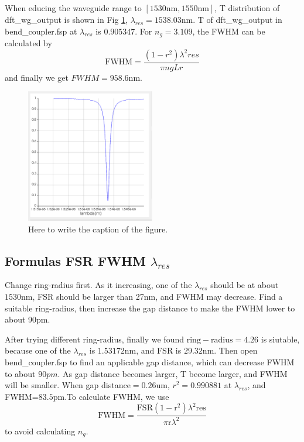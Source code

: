 \documentclass[fontsize=11pt]{scrartcl}
\begin{document}
\subsection{}
When educing the waveguide range to $[1530\mathrm{nm},1550\mathrm{nm}]$, 
T distribution of dft\_wg\_output is shown in Fig \ref{fig3.2}, 
$\lambda_{res}=1538.03\mathrm{nm}$. 
T of dft\_wg\_output in bend\_coupler.fsp at $\lambda_{res}$ is $0.905347$. 
For $n_g=3.109$, the FWHM can be calculated by 
\begin{equation}
    \mathrm{FWHM}=\frac{\left(1-r^{2}\right) \lambda^{2} r e s}{\pi n g L r}
    \label{eq4}
\end{equation}
and finally we get $FWHM=958.6\mathrm{nm}$.
\begin{figure}[H]
    \centering
     \includegraphics[width=0.5\textwidth]{img/fig3.2.png}
     \caption{Here to write the caption of the figure.}
     \label{fig3.2}
\end{figure}  
\subsection{Formulas FSR FWHM $\lambda_{res}$}
Change ring-radius first. 
As it increasing, one of the $\lambda_{res}$ should be at about $1530\mathrm{nm}$, 
FSR should be larger than 27nm, and FWHM may decrease. 
Find a suitable ring-radius, then increase the gap distance to make the FWHM lower 
to about 90pm.

After trying different ring-radius, finally we found $\mathrm{ring-radius}=4.26$ is siutable, 
because one  of the $\lambda_{res}$ is $1.53172\mathrm{nm}$, and FSR is $29.32\mathrm{nm}$. 
Then open bend\_coupler.fsp to find an applicable gap distance, 
which can decrease FWHM to about $90pm$. As gap distance becomes larger,
 T become larger, and FWHM will be smaller. When gap distance$=0.26\mathrm{um}$, $r^2=0.990881$ at $\lambda_{res}$, 
 and FWHM=$83.5\mathrm{pm}$.To calculate FWHM, we use
 \begin{equation}
    \mathrm{FWHM}=\frac{\mathrm{FSR}\left(1-\mathrm{r}^{2}\right) \lambda^{2} \mathrm{res}}{\pi \mathrm{r} \lambda^{2}}
    \label{eq5}
\end{equation}
 to avoid calculating $n_g$.
\end{document}
